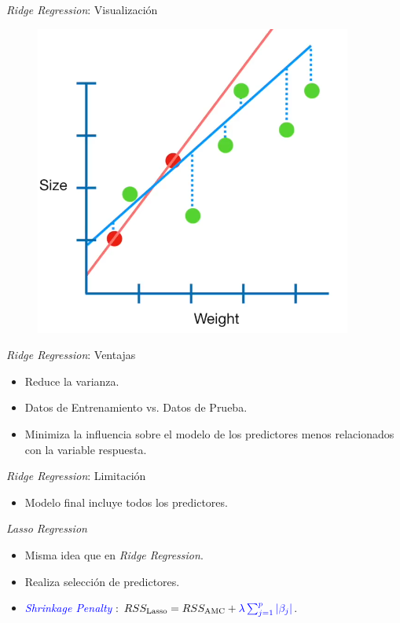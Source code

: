 \documentclass[11pt]{beamer}
\begin{document}
\begin{frame}{\textit{Ridge Regression}: Visualización}
	\begin{figure}
		\includegraphics[scale=0.4]{figures/ridge.png}
	\end{figure}
\end{frame}


\begin{frame}{\textit{Ridge Regression}: Ventajas}
	\begin{itemize}
		\item Reduce la varianza.
		\pause
		\item Datos de Entrenamiento vs. Datos de Prueba.
		\pause
		\item Minimiza la influencia sobre el modelo de los predictores menos relacionados con la variable respuesta.
	\end{itemize}
\end{frame}

\begin{frame}{\textit{Ridge Regression}: Limitación}
	\begin{itemize}
		\item Modelo final incluye todos los predictores.
	\end{itemize}
\end{frame}

\begin{frame}{\textit{Lasso Regression}}
	\begin{itemize}
		\item Misma idea que en \textit{Ridge Regression}.
		\pause
		\item Realiza selección de predictores.
		\pause
		\item \textcolor{blue}{\textit{Shrinkage Penalty}} : $RSS_{\text{Lasso}} = RSS_{\text{AMC}} + \textcolor{blue}{\lambda \sum^p_{j=1} |\beta_j|}$.
	\end{itemize}
\end{frame}
\end{document}
